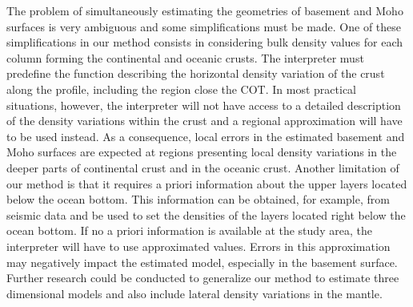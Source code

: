 \documentclass[manuscript]{geophysics}
\begin{document}
The problem of simultaneously estimating the geometries of basement and Moho surfaces
is very ambiguous and some simplifications must be made. 
One of these simplifications in our method consists in considering bulk density 
values for each column forming the continental and oceanic crusts. 
The interpreter must predefine the function describing the horizontal density
variation of the crust along the profile, including the region 
close the COT.
In most practical situations, however, the interpreter will not have access to a detailed
description of the density variations within the crust and a regional approximation
will have to be used instead.
As a consequence, local errors in the estimated basement and Moho surfaces are expected 
at regions presenting local density variations in the deeper parts of continental crust 
and in the oceanic crust.
Another limitation of our method is that it requires a priori information about the
upper layers located below the ocean bottom.
This information can be obtained, for example, from seismic data and be used to set
the densities of the layers located right below the ocean bottom.
If no a priori information is available at the study area, the interpreter will have to use
approximated values.
Errors in this approximation may negatively impact the estimated model, especially in 
the basement surface.
Further research could be conducted to generalize our method to estimate
three dimensional models and also include lateral density variations in 
the mantle.



\end{document}

